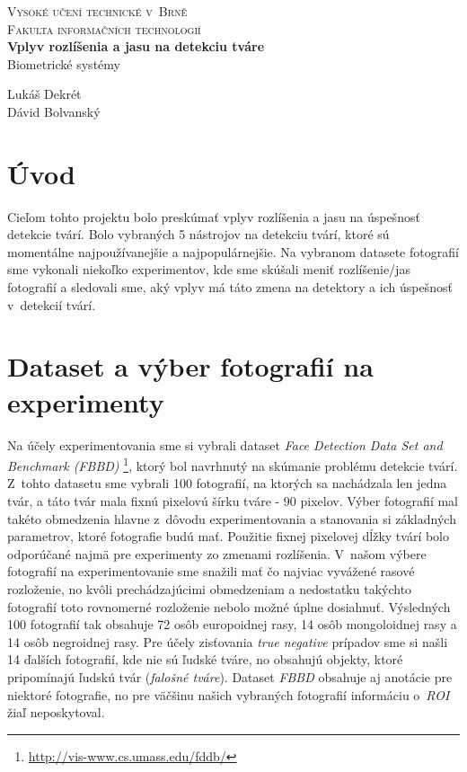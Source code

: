 \documentclass[]{article}
\begin{document}
	
	\begin{titlepage}
		\begin{center}
			\textsc{{\LARGE Vysoké učení technické v~Brně\\[0.3em]
					Fakulta informačních technologií}}\\
			{\Huge \textbf{Vplyv rozlíšenia a jasu na detekciu tváre}\\[0.5em]}
			\Large{Biometrické systémy}
		\end{center}
		
		{\noindent \large Lukáš Dekrét\\Dávid Bolvanský}
	\end{titlepage}
	
	\section{Úvod}
	Cieľom tohto projektu bolo preskúmať vplyv rozlíšenia a jasu na úspešnosť detekcie tvárí. Bolo vybraných 5 nástrojov na detekciu tvárí, ktoré sú momentálne najpoužívanejšie a najpopulárnejšie. Na vybranom datasete fotografií sme vykonali niekoľko experimentov, kde sme skúšali meniť rozlíšenie/jas fotografií a sledovali sme, aký vplyv má táto zmena na detektory a ich úspešnosť v~detekcií tvárí.
	
	\section{Dataset a výber fotografií na experimenty}
	Na účely experimentovania sme si vybrali dataset \textit{Face Detection Data Set and Benchmark  (FBBD)} \footnote{\url{http://vis-www.cs.umass.edu/fddb/}}, ktorý bol navrhnutý na skúmanie problému detekcie tvárí.
	Z~tohto datasetu sme vybrali 100 fotografií, na ktorých sa nachádzala len jedna tvár, a táto tvár mala fixnú pixelovú šírku tváre \-- 90 pixelov. Výber fotografií mal takéto obmedzenia hlavne z~dôvodu experimentovania a stanovania si základných parametrov, ktoré fotografie budú mať. Použitie fixnej pixelovej dĺžky tvárí bolo odporúčané najmä pre experimenty zo zmenami rozlíšenia.
	V~našom výbere fotografií na experimentovanie sme snažili mať čo najviac vyvážené rasové rozloženie, no kvôli prechádzajúcimi obmedzeniam a nedostatku takýchto fotografií toto rovnomerné rozloženie nebolo možné úplne dosiahnuť. Výsledných 100 fotografií tak obsahuje 72 osôb europoidnej rasy, 14 osôb mongoloidnej rasy a 14 osôb negroidnej rasy. Pre účely zisťovania \textit{true negative} prípadov sme si našli 14 ďalších fotografií, kde nie sú ľudské tváre, no obsahujú objekty, ktoré pripomínajú ľudskú tvár (\textit{falošné tváre}). Dataset \textit{FBBD} obsahuje aj anotácie pre niektoré fotografie, no pre väčšinu našich vybraných fotografií informáciu o~\textit{ROI} žiaľ neposkytoval.
	
\end{document}
